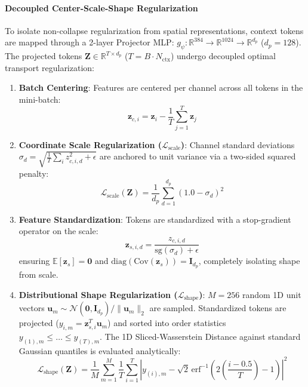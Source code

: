 \documentclass{article}
\begin{document}
\paragraph{Decoupled Center-Scale-Shape Regularization}
To isolate non-collapse regularization from spatial representations, context tokens are mapped through a 2-layer Projector MLP: $g_\psi: \mathbb{R}^{384} \to \mathbb{R}^{1024} \to \mathbb{R}^{d_p}$ ($d_p = 128$). The projected tokens $\mathbf{Z} \in \mathbb{R}^{T \times d_p}$ ($T = B \cdot N_{\text{ctx}}$) undergo decoupled optimal transport regularization:
\begin{enumerate}
    \item \textbf{Batch Centering}: Features are centered per channel across all tokens in the mini-batch:
    \begin{equation}
        \mathbf{z}_{c, i} = \mathbf{z}_i - \frac{1}{T}\sum_{j=1}^T \mathbf{z}_j
    \end{equation}
    \item \textbf{Coordinate Scale Regularization ($\mathcal{L}_{\text{scale}}$)}: Channel standard deviations $\sigma_d = \sqrt{\frac{1}{T}\sum_i z_{c, i, d}^2 + \epsilon}$ are anchored to unit variance via a two-sided squared penalty:
    \begin{equation}
        \mathcal{L}_{\text{scale}}(\mathbf{Z}) = \frac{1}{d_p} \sum_{d=1}^{d_p} (1.0 - \sigma_d)^2
    \end{equation}
    \item \textbf{Feature Standardization}: Tokens are standardized with a stop-gradient operator on the scale:
    \begin{equation}
        \mathbf{z}_{s, i, d} = \frac{z_{c, i, d}}{\text{sg}(\sigma_d) + \epsilon}
    \end{equation}
    ensuring $\mathbb{E}[\mathbf{z}_s] = \mathbf{0}$ and $\text{diag}(\text{Cov}(\mathbf{z}_s)) = \mathbf{I}_{d_p}$, completely isolating shape from scale.
    \item \textbf{Distributional Shape Regularization ($\mathcal{L}_{\text{shape}}$)}: $M = 256$ random 1D unit vectors $\mathbf{u}_m \sim \mathcal{N}(\mathbf{0}, \mathbf{I}_{d_p}) / \|\mathbf{u}_m\|_2$ are sampled. Standardized tokens are projected ($y_{i, m} = \mathbf{z}_{s, i}^T \mathbf{u}_m$) and sorted into order statistics $y_{(1), m} \le \dots \le y_{(T), m}$. The 1D Sliced-Wasserstein Distance against standard Gaussian quantiles is evaluated analytically:
    \begin{equation}
        \mathcal{L}_{\text{shape}}(\mathbf{Z}) = \frac{1}{M} \sum_{m=1}^M \frac{1}{T} \sum_{i=1}^T \left| y_{(i), m} - \sqrt{2}\,\text{erf}^{-1}\left(2\left(\frac{i - 0.5}{T}\right) - 1\right) \right|^2
    \end{equation}
\end{enumerate}
\end{document}
